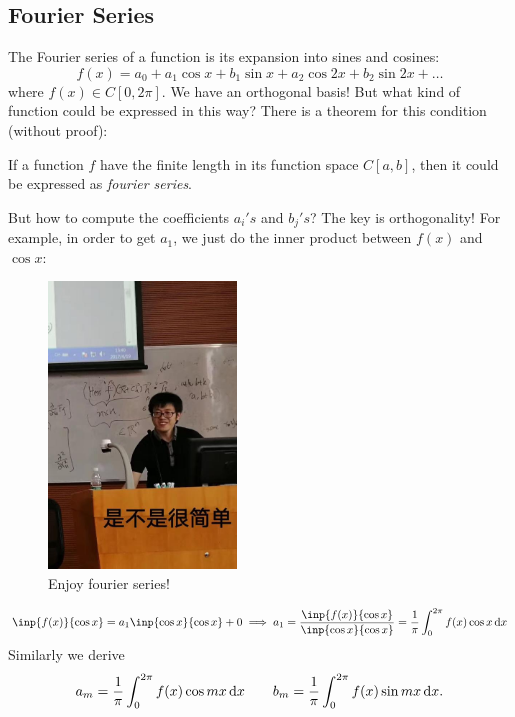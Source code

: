 \subsection{Fourier Series}
The Fourier series of a function is its expansion into sines and cosines:
\[
f(x)=a_0+a_1\cos x+b_1\sin x+a_2\cos 2x+b_2\sin 2x+\dots
\]
where $f(x)\in C[0,2\pi]$. We have an orthogonal basis! But what kind of function could be expressed in this way? There is a theorem for this condition (without proof):
\begin{theorem}
If a function $f$ have the finite length in its function space $C[a,b]$, then it could be expressed as \textit{fourier series}.
\end{theorem}
But how to compute the coefficients $a_i's$ and $b_j's$? The key is orthogonality! For example, in order to get $a_1$, we just do the inner product between $f(x)$ and $\cos x$:
\begin{figure}[H]\centering
\includegraphics[width=5cm]{week5/1810645243}
\caption{Enjoy fourier series!}
\end{figure}
\[
\inp{f(x)}{\cos x}=a_1\inp{\cos x}{\cos x}+0
\implies
a_1=\frac{\inp{f(x)}{\cos x}}{\inp{\cos x}{\cos x}}=\frac{1}{\pi}\int_{0}^{2\pi}f(x)\cos x\diff x
\]
Similarly we derive 
\[
a_m=\frac{1}{\pi}\int_{0}^{2\pi}f(x)\cos mx\,\mathrm{d} x
\qquad
b_m=\frac{1}{\pi}\int_{0}^{2\pi}f(x)\sin mx\,\mathrm{d} x.
\]